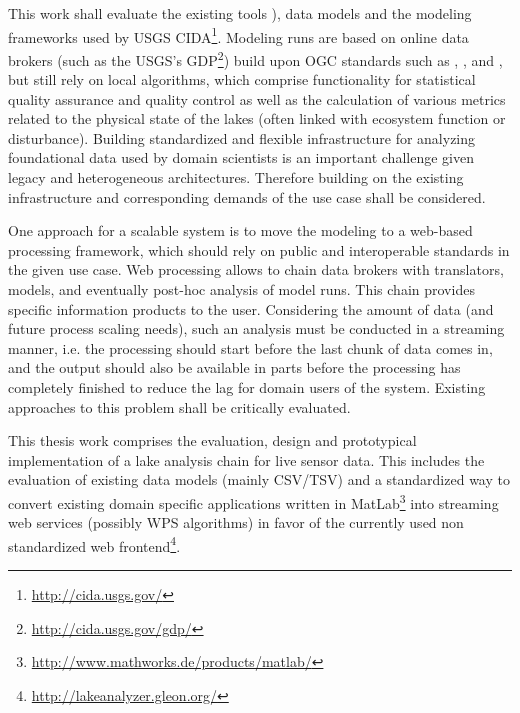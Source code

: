 This work shall evaluate the existing tools \citep[e.g. \la\footnote{\url{https://github.com/GLEON/Lake-Analyzer}}, see][]{read2011derivation}), data models and the modeling frameworks used by USGS CIDA\footnote{\url{http://cida.usgs.gov/}}.
Modeling runs are based on online data brokers (such as the USGS’s \ac{GDP}\footnote{\url{http://cida.usgs.gov/gdp/}}) build upon \ac{OGC} standards such as , ,  and , but still rely on local algorithms, which comprise functionality for statistical quality assurance and quality control as well as the calculation of various metrics related to the physical state of the lakes (often linked with ecosystem function or disturbance). Building standardized and flexible infrastructure for analyzing foundational data used by domain scientists is an important challenge given legacy and heterogeneous architectures.
Therefore building on the existing infrastructure and corresponding demands of the use case shall be considered.

One approach for a scalable system is to move the modeling to a web-based processing framework, which should rely on public and interoperable standards in the given use case.
Web processing allows to chain data brokers with translators, models, and eventually post-hoc analysis of model runs.
This chain provides specific information products to the user.
Considering the amount of data (and future process scaling needs), such an analysis must be conducted in a streaming manner, i.e. the processing should start before the last chunk of data comes in, and the output should also be available in parts before the processing has completely finished to reduce the lag for domain users of the system.
Existing approaches to this problem shall be critically evaluated.

This thesis work comprises the evaluation, design and prototypical implementation of a lake analysis chain for live sensor data.
This includes the evaluation of existing data models (mainly CSV/TSV) and a standardized way to convert existing domain specific applications written in MatLab\footnote{\url{http://www.mathworks.de/products/matlab/}} into streaming web services (possibly WPS algorithms) in favor of the currently used non standardized web frontend\footnote{\url{http://lakeanalyzer.gleon.org/}}.

